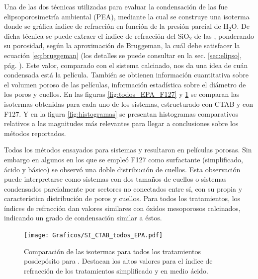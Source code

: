 		Una de las dos técnicas utilizadas para evaluar la condensación de las \pdm\space fue elipsoporosimetría ambiental (PEA), mediante la cual se construye una isoterma donde se gráfica índice de refracción en función de la presión parcial de H$_2$O. De dicha técnica se puede extraer el índice de refracción del SiO$_2$ de las \pdm, ponderando su porosidad, según la aproximación de Bruggeman, la cuál debe satisfacer la ecuación \ref{eq:bruggeman} \cite{Bruggeman1935} (los detalles se puede consultar en la sec. \ref{sec:elipso}, pág. \pageref{sec:elipso}). Este valor, comparado con el sistema calcinado, nos da una idea de cuán condensada está la película. También se obtienen información cuantitativa sobre el volumen poroso de las películas, información estadística sobre el diámetro de los poros y cuellos. En las figuras \ref{fig:todos_EPA_F127} y \ref{fig:todos_EPA_CTAB} se comparan las isotermas obtenidas para cada uno de los sistemas, estructurado con CTAB y con F127. Y en la figura \ref{fig:histogramas} se presentan histogramas comparativos relativos a las magnitudes más relevantes para llegar a conclusiones sobre los métodos reportados.

		Todos los métodos ensayados para sistemas \pdmF\space y \pdmC\space resultaron en películas porosas. Sin embargo en algunos en los que se empleó F127 como surfactante (simplificado, ácido y básico) se observó una doble distribución de cuellos. Esta observación puede interpretarse como sistemas con dos tamaños de cuellos o sistemas condensados parcialmente por sectores no conectados entre sí, con su propia y característica distribución de poros y cuellos. Para todos los tratamientos, los índices de refracción dan valores similares con óxidos mesoporosos calcinados, indicando un grado de condensación similar a éstos. 


			\begin{figure}[bh!]
		 	   	   \begin{center}
		 	   	   \texttt{[image: Graficos/SI\_CTAB\_todos\_EPA.pdf]}
			   	   \caption[Comparación PEA tratamientos alternativos (CTAB)]{Comparación de las isotermas para todos los tratamientos posdepósito para \pdmC. Destacan los altos valores para el índice de refracción de los tratamientos simplificado y en medio ácido.}
				   \label{fig:todos_EPA_CTAB}	
				   \end{center}
				   \end{figure}
			
